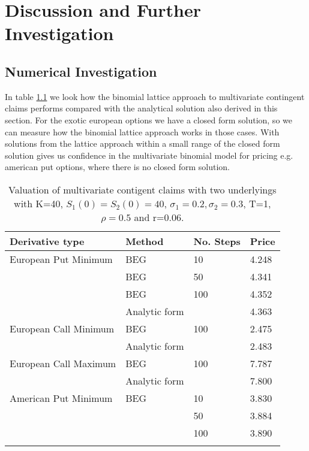 
\chapter{Discussion and Further Investigation} %

\label{Chapter6} %


\section{Numerical Investigation}
In table \ref{tab:multidimTree} we look how the binomial lattice approach to multivariate contingent claims performs compared with the analytical solution also derived in this section. For the exotic european options we have a closed form solution, so we can measure how the binomial lattice approach works in those cases. With solutions from the lattice approach within a small range of the closed form solution gives us confidence in the multivariate binomial model for pricing e.g. american put options, where there is no closed form solution.
\begin{table}[H]
\caption{Valuation of multivariate contigent claims with two underlyings with K=40, $S_1(0)=S_2(0)=40$, $\sigma_1=0.2, \sigma_2=0.3$, T=1, $\rho=0.5$  and r=0.06.}
\label{tab:multidimTree}
\centering
\begin{tabular}{l l l l}
\toprule
\textbf{Derivative type} & \textbf{Method} & \textbf{No. Steps} & \textbf{Price} \\
\midrule
European Put Minimum & BEG & 10 & 4.248 \\
 & BEG & 50 & 4.341 \\
 & BEG & 100 & 4.352 \\
& Analytic form & & 4.363\\
European Call Minimum & BEG & 100 & 2.475\\
& Analytic form & & 2.483\\
European Call Maximum & BEG & 100 & 7.787\\
& Analytic form & & 7.800\\
American Put Minimum & BEG & 10 & 3.830\\
 &  & 50 & 3.884\\
 &  & 100 & 3.890\\
\bottomrule\\
\end{tabular}
\end{table}

